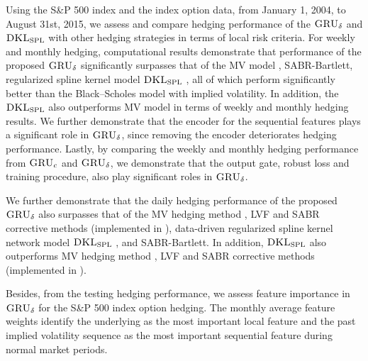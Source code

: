 \documentclass[letterpaper,12pt,titlepage,oneside,final]{book}
\numberwithin{equation}{section}
\theoremstyle{definition}
\newcommand{\model}{\textsc{GRU}_\delta}
\newcommand{\DKLs}{\bf\textsc{DKL}_{\text{SPL}}}
\begin{document}
Using the S\&P 500 index and the index option data,  from January 1, 2004, to  August 31st, 2015, we assess and compare hedging performance of the  $\model$ and $\DKLs$ with other hedging strategies in terms of local risk criteria.
For weekly and monthly hedging, computational results demonstrate that performance of the proposed $\model$  significantly surpasses that of the MV model , SABR-Bartlett, regularized spline kernel model $\DKLs$ , all of which perform significantly better than the Black–Scholes model with implied volatility.
In addition, the $\DKLs$ also outperforms MV model in terms of weekly and monthly hedging results.
We further demonstrate that the encoder for the sequential features plays a significant role in $\model$, since removing the encoder deteriorates hedging performance.
Lastly, by comparing the weekly and monthly hedging performance from $\textsc{GRU}_{c}$ and $\model$, we demonstrate that the output gate,  robust loss and training procedure, also play  significant roles in $\model$.

We further demonstrate that the daily hedging performance of the proposed $\model$  also surpasses that of the MV hedging method , LVF and SABR corrective methods  (implemented in \cite{hulloptimal}), data-driven regularized spline kernel network model $\DKLs$ , and SABR-Bartlett. In addition, $\DKLs$ also outperforms MV hedging method , LVF and SABR corrective methods  (implemented in \cite{hulloptimal}).

Besides, from the testing hedging performance, we assess feature importance in  $\model$  for the S\&P 500 index  option hedging. The monthly average feature weights identify the underlying as the most important local feature and the past implied volatility sequence as the most important sequential feature during normal market periods.
\end{document}
